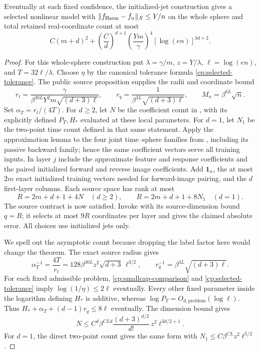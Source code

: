\begin{proposition}
\label{cp:harmonic}
Eventually at each fixed confidence, the initialized-jet construction gives
a selected nonlinear model with $\|f_{\rm Harm}-f_n\|_{\mathcal X}\le Y/n$
on the whole sphere and total retained real-coordinate count at most
\[
 C(m+d)^2+\left(\frac Cd\right)^{d+1}
       \left(\frac{Ym}\gamma\right)^4[\log(en)]^{3d+2}.
\]
\end{proposition}
\begin{proof}
For this whole-sphere construction put $\lambda=\gamma/m$,
$z=Y/\lambda$, $\ell=\log(en)$, and $T=32\ell/\lambda$.
Choose $\eta$ by the canonical tolerance formula
\eqref{cp:selected-tolerance}. The public source proposition supplies
the radii and coordinate bound
\[
 r_t=\frac{\gamma}
 {\beta^{30L}Y^2m\sqrt{(d+3)\ell}},\qquad
 r_q=\frac1{\beta^{3L}\sqrt{(d+3)\ell}},\qquad
 M_n=\beta^{6L}\sqrt n.
\]
Set $\alpha_T=r_t/(4T)$. For $d\ge2$, let $N$ be the coefficient
count in , with its explicitly defined
$P_T,H_*$ evaluated at these local parameters. For $d=1$, let $N_1$
be the two-point time count defined in that same statement.
Apply the approximation lemma to the four joint time--sphere families
from , including its passive backward family; hence
the same coefficient vectors serve all training inputs. In layer $j$
include the approximate feature and response coefficients and the
paired initialized forward and reverse image coefficients. Add
$\mathbf1_n$, the at most $2m$ exact initialized training vectors
needed for forward-image pairing, and the $d$ first-layer columns.
Each source space has rank at most
\[
 R=2m+d+1+4N\quad(d\ge2),\qquad
 R=2m+d+1+8N_1\quad(d=1).
\]
The source contract is now satisfied. Invoke  with
its source-dimension bound $q=R$; it selects at most $9R$ coordinates
per layer and gives
the claimed absolute error. All choices use initialized jets only.

We spell out the asymptotic count because dropping the label factor
here would change the theorem. The exact source radius gives
\begin{equation}
 \alpha_T^{-1}=\frac{4T}{r_t}
       =128\beta^{30L}z^2\sqrt{d+3}\,\ell^{3/2},\qquad
 r_q^{-1}=\beta^{3L}\sqrt{(d+3)\ell}.
 \label{cp:time-radius-count}
\end{equation}
For each fixed admissible problem, \eqref{cp:smallcap-comparison}
and \eqref{cp:selected-tolerance} imply
$\log(1/\eta)\le2\ell$ eventually. Every other fixed parameter
inside the logarithm defining $H_*$ is additive, whereas
$\log P_T=O_{d,\mathrm{problem}}(\log\ell)$.
Thus $H_*+\alpha_T+(d-1)r_q\le8\ell$ eventually. The dimension
bound gives
\[
 N\le C^d\beta^{CLd}\frac{(d+3)^{d/2}}{d!}\,
                    z^2\ell^{3d/2+1}.
\]
For $d=1$, the direct two-point count gives the same form with
$N_1\le C\beta^{CL}z^2\ell^{5/2}$.


\end{proof}
